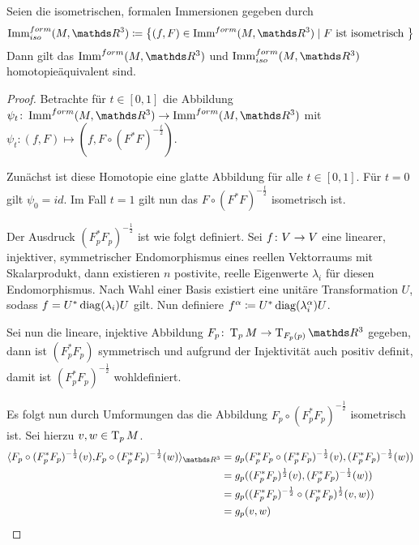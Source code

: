 \begin{Satz}
  Seien die isometrischen, formalen Immersionen gegeben durch
  \begin{gather*}
    \Immfi{M}{\R^3} \coloneqq \set{(f,F) \in \Immf{M}{\R^3}}{F \text{
        ist isometrisch }}
  \end{gather*}
  Dann gilt das $\Immf{M}{\R^3}$ und $\Immfi{M}{\R^3}$
  homotopieäquivalent sind.
	\begin{proof}
          Betrachte für $t \in [0,1]$ die Abbildung
          $\abb{\psi_t}{\Immf{M}{\R^3}}{\Immf{M}{\R^3}}$ mit
          $\psi_t : (f,F) \mapsto (f,F \circ
          (F^{\ast}F)^{-\frac{t}{2}})$.
		
          Zunächst ist diese Homotopie eine glatte Abbildung für alle
          $ t \in [0,1] $. Für $ t=0 $ gilt $ \psi_0 = id $. Im Fall
          $ t=1 $ gilt nun das $ F \circ (F^{\ast}F)^{-\frac{t}{2}} $
          isometrisch ist.
		
          Der Ausdruck $ (F_p^\ast F_p)^{-\frac{1}{2}} $ ist wie folgt
          definiert. Sei $ f \colon V \rightarrow V $ eine linearer, injektiver,
          symmetrischer Endomorphismus eines reellen Vektorraums mit
          Skalarprodukt, dann existieren $ n $ postivite, reelle
          Eigenwerte $ \lambda_i $ für diesen Endomorphismus. Nach
          Wahl einer Basis existiert eine unitäre Transformation
          $ U $, sodass $ f = U^\ast \operatorname{diag}(\lambda_i) U $ gilt. Nun
          definiere
          $ f^\alpha \coloneqq U^\ast \operatorname{diag}(\lambda_i^\alpha) U $.
		
          Sei nun die lineare, injektive Abbildung
          $ \abb{F_p}{\tang{p}{M}}{\tang{F_p(p)}{\R^3}} $ gegeben,
          dann ist $ (F_p^\ast F_p) $ symmetrisch und aufgrund der
          Injektivität auch positiv definit, damit ist
          $ (F_p^\ast F_p)^{-\frac{1}{2}} $ wohldefiniert.
		
          Es folgt nun durch Umformungen das die Abbildung
          $ F_p \circ (F_p^\ast F_p)^{-\frac{1}{2}} $ isometrisch
          ist. Sei hierzu $ v,w \in \operatorname{T}_{p}M $.
          \begin{align*}
            \scalar{F_p \circ (F_p^\ast F_p)^{-\frac{1}{2}}(v)}{F_p \circ (F_p^\ast F_p)^{-\frac{1}{2}}(w)}_{\R^3} &=
                                                                                                                     g_p(F_p^\ast F_p \circ (F_p^\ast F_p)^{-\frac{1}{2}}(v),(F_p^\ast F_p)^{-\frac{1}{2}}(w)) \\
                                                                                                                   &= g_p((F_p^\ast F_p)^\frac{1}{2}(v),(F_p^\ast F_p)^{-\frac{1}{2}}(w)) \\
                                                                                                                   &= g_p((F_p^\ast F_p)^{-\frac{1}{2}} \circ (F_p^\ast F_p)^\frac{1}{2}(v,w)) \\
                                                                                                                   &= g_p(v,w)
		\end{align*}
		

\end{proof}
\end{Satz}
